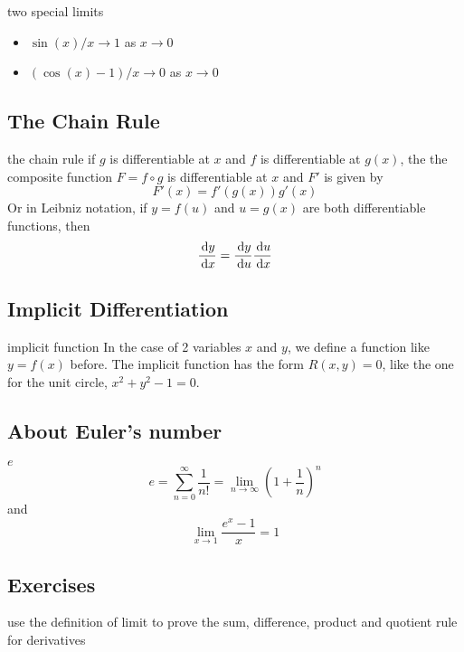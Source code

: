 \documentclass[Calculus 1 Recitation.tex]{subfiles}
\begin{document}
\begin{myleftlinebox}
	two special limits
	\tcblower
	\begin{itemize}
		\item $\sin(x)/x\to 1$ as $x\to 0$
		\item $(\cos(x)-1)/x\to 0$ as $x\to 0$
	\end{itemize}
\end{myleftlinebox}

\subsection{The Chain Rule}

\begin{myleftlinebox}
	the chain rule
	\tcblower
	if $g$ is differentiable at $x$ and $f$ is differentiable at $g(x)$, the the composite function $F=f\circ g$ is differentiable at $x$ and $F'$ is given by 
	\[F'(x)=f'(g(x))g'(x)\]
	Or in Leibniz notation, if $y=f(u)$ and $u=g(x)$ are both differentiable functions, then
	\[\frac{\,\mathrm{d} y}{\,\mathrm{d} x} = \frac{\,\mathrm{d} y}{\,\mathrm{d} u}\frac{\,\mathrm{d} u}{\,\mathrm{d} x}\]
\end{myleftlinebox}

\subsection{Implicit Differentiation}
\begin{myleftlinebox}
	implicit function
	\tcblower
	In the case of 2 variables $x$ and $y$, we define a function like $y=f(x)$ before. The implicit function has the form $R(x,y)=0$, like the one for the unit circle, $x^2+y^2-1=0$.
\end{myleftlinebox}

\subsection{About Euler's number}
\begin{myleftlinebox}
	$e$
	\tcblower
	\[e=\sum_{n=0}^\infty \frac{1}{n!}=\lim_{n\to\infty}(1+\frac{1}{n})^n\]
	and
	\[\lim_{x\to 1}\frac{e^x-1}{x}=1\]
\end{myleftlinebox}
\subsection{Exercises}

\begin{myleftlinebox}
	use the definition of limit to prove the sum, difference, product and quotient rule for derivatives
	\tcblower
	\vspace{3em}
\end{myleftlinebox}
\end{document}
